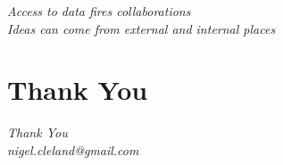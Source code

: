 \documentclass[xcolor=x11names,compress]{beamer}
\renewcommand{\(}{\begin{columns}}
\renewcommand{\)}{\end{columns}}
\newcommand{\<}[1]{\begin{column}{#1}}
\renewcommand{\>}{\end{column}}
\begin{document}
\begin{frame}
\vspace{1.5cm}
\begin{center}
{\Huge\textit{Access to data fires collaborations \\
\vspace{0.5cm}
Ideas can come from external and internal places}}
\end{center}
\end{frame}

\section*{Thank You}
\begin{frame}
\vspace{1.5cm}
\begin{center}
{\Huge\textit{Thank You}} \\
\vspace{0.5cm}
\textit{nigel.cleland@gmail.com}
\end{center}
\end{frame}
\end{document}
